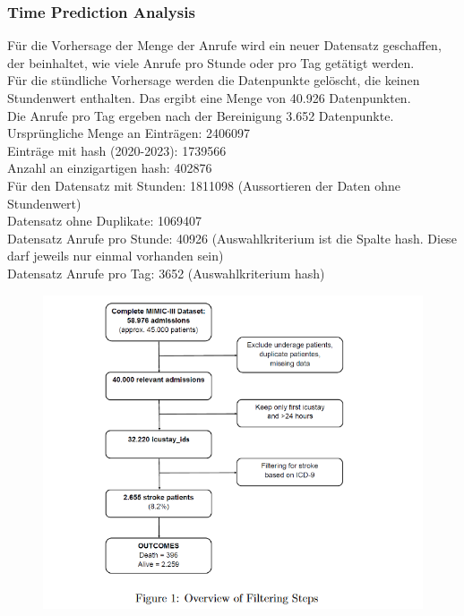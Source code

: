 \documentclass[12pt]{report}
\begin{document}
	\subsubsection{Time Prediction Analysis}
	Für die Vorhersage der Menge der Anrufe wird ein neuer Datensatz
	geschaffen, der beinhaltet, wie viele Anrufe pro Stunde oder pro Tag getätigt werden.\\
	Für die stündliche Vorhersage werden die Datenpunkte gelöscht, die keinen Stundenwert enthalten. Das ergibt eine Menge von 40.926 Datenpunkten.\\
	Die Anrufe pro Tag ergeben nach der Bereinigung 3.652 Datenpunkte.\\
	Ursprüngliche Menge an Einträgen: 2406097 \\
	Einträge mit hash (2020-2023): 1739566\\
	Anzahl an einzigartigen hash: 402876\\
	Für den Datensatz mit Stunden: 1811098
	(Aussortieren der Daten ohne Stundenwert)\\
	Datensatz ohne Duplikate: 1069407\\
	Datensatz Anrufe pro Stunde: 40926 (Auswahlkriterium ist die Spalte hash. Diese darf jeweils nur einmal vorhanden sein)\\
	Datensatz Anrufe pro Tag: 3652 (Auswahlkriterium hash)\\
	\begin{figure}
		\centering
		\includegraphics[width=0.7\linewidth]{screenshot001}
		\caption{}
		\label{fig:screenshot001}
	\end{figure}
\end{document}
